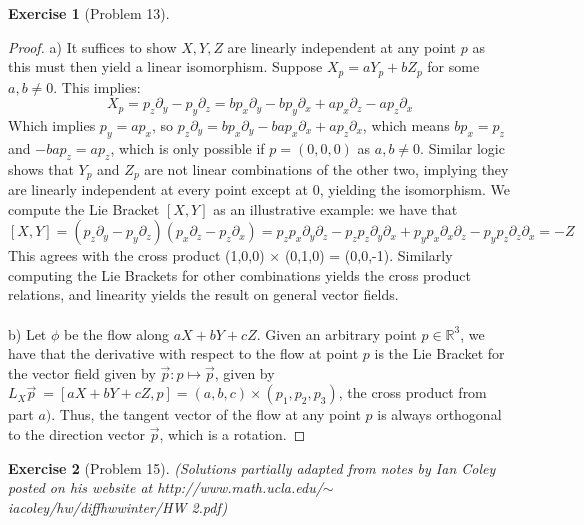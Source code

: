\documentclass{article}
\newtheorem{exercise}{Exercise}
\begin{document}
\begin{exercise}[Problem 13]
\end{exercise}

\begin{proof}
  a) It suffices to show $X, Y, Z$ are linearly independent at any point $p$ as this must then yield a linear isomorphism. Suppose $X_{p} = aY_{p} + bZ_{p}$ for some $a,b \neq 0$. This implies:
  \[
    X_{p} = p_{z}\partial_{y} - p_{y}\partial_{z} = bp_{x}\partial_{y} - bp_{y}\partial_{x} + ap_{x}\partial_{z} - ap_{z}\partial_{x} 
  \]
  Which implies $p_{y} = ap_{x}$, so $p_{z}\partial_{y} = bp_{x}\partial_{y} - bap_{x}\partial_{x} + ap_{z}\partial_{x}$, which means $bp_{x} = p_{z}$ and $-bap_{z} = ap_{z}$, which is only possible if $p = (0,0,0)$ as $a,b \neq 0$. Similar logic shows that $Y_{p}$ and $Z_{p}$ are not linear combinations of the other two, implying they are linearly independent at every point except at $0$, yielding the isomorphism. We compute the Lie Bracket $[X, Y]$ as an illustrative example: we have that \[[X,Y] = (p_{z}\partial_{y} - p_{y}\partial_{z})(p_{x}\partial_{z} - p_{z}\partial_{x}) = p_{z}p_{x}\partial_{y}\partial_{z} - p_{z}p_{z}\partial_{y}\partial_{x} + p_{y}p_{x}\partial_{x}\partial_{z} - p_{y}p_{z}\partial_{z}\partial_{x} = -Z \]
  This agrees with the cross product (1,0,0) $\times$ (0,1,0) = (0,0,-1). Similarly computing the Lie Brackets for other combinations yields the cross product relations, and linearity yields the result on general vector fields. \\ \\
  
  b) Let $\phi$ be the flow along $aX + bY + cZ$. Given an arbitrary point $p \in \mathbb{R}^{3}$, we have that the derivative with respect to the flow at point $p$ is the Lie Bracket for the vector field given by $\vec{p}: p \mapsto \vec{p}$, given by $L_{X}\vec{p} \ = [aX+bY+cZ, p] = (a,b,c) \times (p_{1},p_{2},p_{3})$, the cross product from part $a)$. Thus, the tangent vector of the flow at any point $p$ is always orthogonal to the direction vector $\vec{p}$, which is a rotation.
\end{proof}

\begin{exercise}[Problem 15]
  (Solutions partially adapted from notes by Ian Coley posted on his website at http://www.math.ucla.edu/$\sim$iacoley/hw/diffhwwinter/HW 2.pdf)
\end{exercise}
\end{document}
